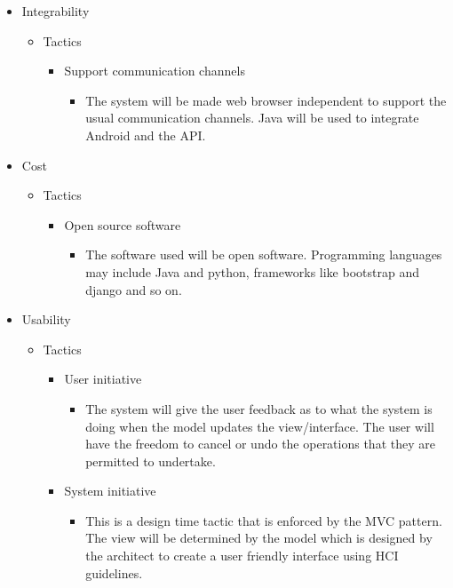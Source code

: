 \documentclass{article}
\begin{document}
\begin{itemize}
\begin{itemize}
		\end{itemize}
		\item Integrability
		\begin{itemize}

			
			\item Tactics
			\begin{itemize}
				
				\item Support communication channels
					\begin{itemize}
						\item The system will be made web browser independent to support the usual communication channels. Java will be used to integrate Android and the API.
					\end{itemize}
			\end{itemize}			
		
			
		\end{itemize}
		\item Cost
		\begin{itemize}
			
			\item Tactics
			\begin{itemize}
				\item Open source software
					\begin{itemize}
						\item The software used will be open software. Programming languages may include Java and python, frameworks like bootstrap and django and so on. 
					\end{itemize}
			\end{itemize}			
			
		\end{itemize}
		\item Usability
		\begin{itemize}
			
			\item Tactics
			\begin{itemize}

				\item User initiative
				
					\begin{itemize}
						\item The system will give the user feedback as to what the system is doing when the model updates the view/interface. The user will have the freedom to cancel or undo the operations that they are permitted to undertake.
					\end{itemize}				
				
				\item System initiative
					\begin{itemize}
						\item This is a design time tactic that is enforced by the MVC pattern. The view will be determined by the model which is designed by the architect to create a user friendly interface using HCI guidelines.
					\end{itemize}
			\end{itemize}			
			
		\end{itemize}
	\end{itemize}
			
\end{document}
